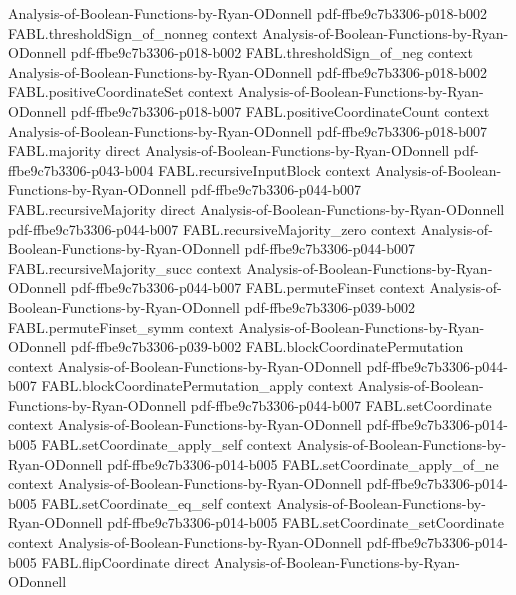 \begin{theorem}
  {Analysis-of-Boolean-Functions-by-Ryan-ODonnell}
  {pdf-ffbe9c7b3306-p018-b002}
\proofstep
  {FABL.thresholdSign_of_nonneg}
  {context}
  {Analysis-of-Boolean-Functions-by-Ryan-ODonnell}
  {pdf-ffbe9c7b3306-p018-b002}
\proofstep
  {FABL.thresholdSign_of_neg}
  {context}
  {Analysis-of-Boolean-Functions-by-Ryan-ODonnell}
  {pdf-ffbe9c7b3306-p018-b002}
\proofstep
  {FABL.positiveCoordinateSet}
  {context}
  {Analysis-of-Boolean-Functions-by-Ryan-ODonnell}
  {pdf-ffbe9c7b3306-p018-b007}
\proofstep
  {FABL.positiveCoordinateCount}
  {context}
  {Analysis-of-Boolean-Functions-by-Ryan-ODonnell}
  {pdf-ffbe9c7b3306-p018-b007}
\proofstep
  {FABL.majority}
  {direct}
  {Analysis-of-Boolean-Functions-by-Ryan-ODonnell}
  {pdf-ffbe9c7b3306-p043-b004}
\proofstep
  {FABL.recursiveInputBlock}
  {context}
  {Analysis-of-Boolean-Functions-by-Ryan-ODonnell}
  {pdf-ffbe9c7b3306-p044-b007}
\proofstep
  {FABL.recursiveMajority}
  {direct}
  {Analysis-of-Boolean-Functions-by-Ryan-ODonnell}
  {pdf-ffbe9c7b3306-p044-b007}
\proofstep
  {FABL.recursiveMajority_zero}
  {context}
  {Analysis-of-Boolean-Functions-by-Ryan-ODonnell}
  {pdf-ffbe9c7b3306-p044-b007}
\proofstep
  {FABL.recursiveMajority_succ}
  {context}
  {Analysis-of-Boolean-Functions-by-Ryan-ODonnell}
  {pdf-ffbe9c7b3306-p044-b007}
\proofstep
  {FABL.permuteFinset}
  {context}
  {Analysis-of-Boolean-Functions-by-Ryan-ODonnell}
  {pdf-ffbe9c7b3306-p039-b002}
\proofstep
  {FABL.permuteFinset_symm}
  {context}
  {Analysis-of-Boolean-Functions-by-Ryan-ODonnell}
  {pdf-ffbe9c7b3306-p039-b002}
\proofstep
  {FABL.blockCoordinatePermutation}
  {context}
  {Analysis-of-Boolean-Functions-by-Ryan-ODonnell}
  {pdf-ffbe9c7b3306-p044-b007}
\proofstep
  {FABL.blockCoordinatePermutation_apply}
  {context}
  {Analysis-of-Boolean-Functions-by-Ryan-ODonnell}
  {pdf-ffbe9c7b3306-p044-b007}
\proofstep
  {FABL.setCoordinate}
  {context}
  {Analysis-of-Boolean-Functions-by-Ryan-ODonnell}
  {pdf-ffbe9c7b3306-p014-b005}
\proofstep
  {FABL.setCoordinate_apply_self}
  {context}
  {Analysis-of-Boolean-Functions-by-Ryan-ODonnell}
  {pdf-ffbe9c7b3306-p014-b005}
\proofstep
  {FABL.setCoordinate_apply_of_ne}
  {context}
  {Analysis-of-Boolean-Functions-by-Ryan-ODonnell}
  {pdf-ffbe9c7b3306-p014-b005}
\proofstep
  {FABL.setCoordinate_eq_self}
  {context}
  {Analysis-of-Boolean-Functions-by-Ryan-ODonnell}
  {pdf-ffbe9c7b3306-p014-b005}
\proofstep
  {FABL.setCoordinate_setCoordinate}
  {context}
  {Analysis-of-Boolean-Functions-by-Ryan-ODonnell}
  {pdf-ffbe9c7b3306-p014-b005}
\proofstep
  {FABL.flipCoordinate}
  {direct}
  {Analysis-of-Boolean-Functions-by-Ryan-ODonnell}

\end{theorem}
